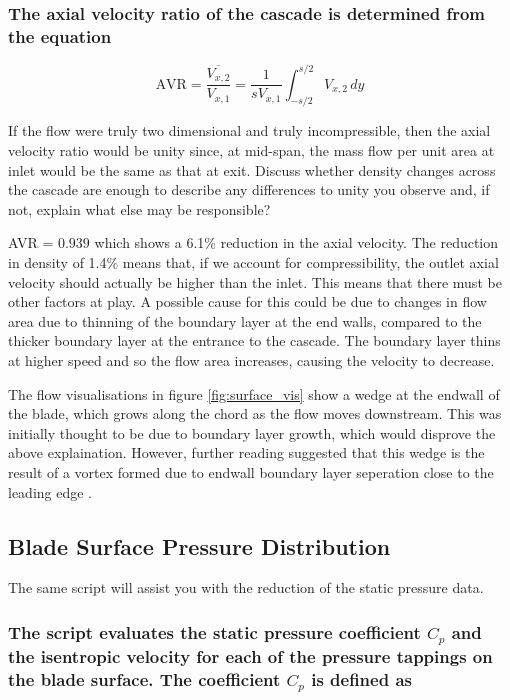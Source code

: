 \documentclass{article}
\begin{document}
\subsubsection{The axial velocity ratio of the cascade is determined from the equation
}
\begin{equation}
    \text{AVR} = \frac{\overline{V_{x,2}}}{V_{x,1}} = \frac{1}{s V_{x,1}} \int_{-s/2}^{s/2} V_{x,2} \, dy
\end{equation}

If the flow were truly two dimensional and truly incompressible, then the axial velocity ratio
would be unity since, at mid-span, the mass flow per unit area at inlet would be the same as
that at exit. Discuss whether density changes across the cascade are enough to describe any
differences to unity you observe and, if not, explain what else may be responsible?

AVR = $0.939$ which shows a 6.1\% reduction in the axial velocity.
The reduction in density of 1.4\% means that, if we account for compressibility, the outlet axial velocity should actually be higher than the inlet.
This means that there must be other factors at play.
A possible cause for this could be due to changes in flow area due to thinning of the boundary layer at the end walls, compared to the thicker boundary layer at the entrance to the cascade.
The boundary layer thins at higher speed and so the flow area increases, causing the velocity to decrease.

The flow visualisations in figure \ref{fig:surface_vis} show a wedge at the endwall of the blade, which grows along the chord as the flow moves downstream.
This was initially thought to be due to boundary layer growth, which would disprove the above explaination.
However, further reading suggested that this wedge is the result of a vortex formed due to endwall boundary layer seperation close to the leading edge \cite{losses}.

\subsection{Blade Surface Pressure Distribution}

The same script will assist you with the reduction of the static pressure data.
\subsubsection{The script evaluates the static pressure coefficient $C_p$ and the isentropic velocity for
each of the pressure tappings on the blade surface. The coefficient $C_p$ is defined as}
\end{document}
